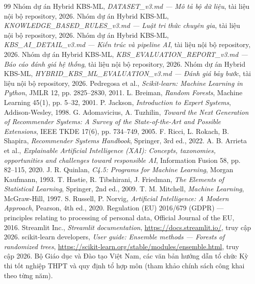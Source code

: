 \documentclass[12pt,a4paper]{report}
\begin{document}
\nocite{*}
\begin{thebibliography}{99}
 Nhóm dự án Hybrid KBS-ML, \textit{DATASET\_v3.md --- Mô tả bộ dữ liệu}, tài liệu nội bộ repository, 2026.
 Nhóm dự án Hybrid KBS-ML, \textit{KNOWLEDGE\_BASED\_RULES\_v3.md --- Luật tri thức chuyên gia}, tài liệu nội bộ repository, 2026.
 Nhóm dự án Hybrid KBS-ML, \textit{KBS\_AI\_DETAIL\_v3.md --- Kiến trúc và pipeline AI}, tài liệu nội bộ repository, 2026.
 Nhóm dự án Hybrid KBS-ML, \textit{KBS\_EVALUATION\_REPORT\_v3.md --- Báo cáo đánh giá hệ thống}, tài liệu nội bộ repository, 2026.
 Nhóm dự án Hybrid KBS-ML, \textit{HYBRID\_KBS\_ML\_EVALUATION\_v3.md --- Đánh giá bảy bước}, tài liệu nội bộ repository, 2026.
 Pedregosa et al., \textit{Scikit-learn: Machine Learning in Python}, JMLR 12, pp. 2825--2830, 2011.
 L. Breiman, \textit{Random Forests}, Machine Learning 45(1), pp. 5--32, 2001.
 P. Jackson, \textit{Introduction to Expert Systems}, Addison-Wesley, 1998.
 G. Adomavicius, A. Tuzhilin, \textit{Toward the Next Generation of Recommender Systems: A Survey of the State-of-the-Art and Possible Extensions}, IEEE TKDE 17(6), pp. 734--749, 2005.
 F. Ricci, L. Rokach, B. Shapira, \textit{Recommender Systems Handbook}, Springer, 3rd ed., 2022.
 A. B. Arrieta et al., \textit{Explainable Artificial Intelligence (XAI): Concepts, taxonomies, opportunities and challenges toward responsible AI}, Information Fusion 58, pp. 82--115, 2020.
 J. R. Quinlan, \textit{C4.5: Programs for Machine Learning}, Morgan Kaufmann, 1993.
 T. Hastie, R. Tibshirani, J. Friedman, \textit{The Elements of Statistical Learning}, Springer, 2nd ed., 2009.
 T. M. Mitchell, \textit{Machine Learning}, McGraw-Hill, 1997.
 S. Russell, P. Norvig, \textit{Artificial Intelligence: A Modern Approach}, Pearson, 4th ed., 2020.
 Regulation (EU) 2016/679 (GDPR) --- principles relating to processing of personal data, Official Journal of the EU, 2016.
 Streamlit Inc., \textit{Streamlit documentation}, \url{https://docs.streamlit.io/}, truy cập 2026.
 scikit-learn developers, \textit{User guide: Ensemble methods --- Forests of randomized trees}, \url{https://scikit-learn.org/stable/modules/ensemble.html}, truy cập 2026.
 Bộ Giáo dục và Đào tạo Việt Nam, các văn bản hướng dẫn tổ chức Kỳ thi tốt nghiệp THPT và quy định tổ hợp môn (tham khảo chính sách công khai theo từng năm).
\end{thebibliography}
\end{document}
